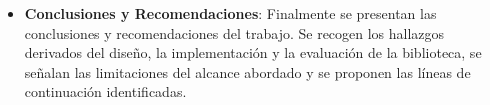 \begin{itemize}
   \item \textbf{Conclusiones y Recomendaciones}:
Finalmente se presentan las conclusiones y recomendaciones del trabajo. Se recogen los hallazgos derivados del diseño, la implementación y la evaluación de la biblioteca, se señalan las limitaciones del alcance abordado y se proponen las líneas de continuación identificadas.
\end{itemize}


